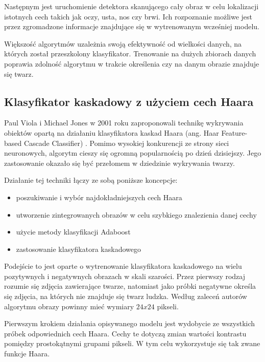 Następnym jest uruchomienie detektora skanującego cały obraz w celu lokalizacji istotnych cech takich jak oczy, usta, nos czy brwi. Ich rozpoznanie możliwe jest przez zgromadzone informacje znajdujące się w wytrenowanym wcześniej modelu.

Większość algorytmów uzależnia swoją efektywność od wielkości danych, na których został przeszkolony klasyfikator. Trenowanie na dużych zbiorach danych poprawia zdolność algorytmu w trakcie określenia czy na danym obrazie znajduje się twarz. \cite{fDetection}


\subsection{Klasyfikator kaskadowy z użyciem cech Haara}
\label{sub:Haar}
Paul Viola i Michael Jones w 2001 roku zaproponowali technikę wykrywania obiektów opartą na działaniu klasyfikatora kaskad Haara (ang. Haar Feature-based Cascade Classifier) \cite{haar}. Pomimo wysokiej konkurencji ze strony sieci neuronowych, algorytm cieszy się ogromną popularnością po dzień dzisiejszy. Jego zastosowanie okazało się być przełomem w dziedzinie wykrywania twarzy. 

Działanie tej techniki łączy ze sobą poniższe koncepcje:
\begin{itemize}
    \item poszukiwanie i wybór najdokładniejszych cech Haara
    \item utworzenie zintegrowanych obrazów w celu szybkiego znalezienia danej cechy
    \item użycie metody klasyfikacji Adaboost
    \item zastosowanie klasyfikatora kaskadowego
\end{itemize}

Podejście to jest oparte o wytrenowanie klasyfikatora kaskadowego na wielu pozytywnych i negatywnych obrazach w skali szarości. Przez pierwszy rodzaj rozumie się zdjęcia zawierające twarze, natomiast jako próbki negatywne określa się zdjęcia, na których nie znajduje się twarz ludzka. Według zaleceń autorów algorytmu obrazy powinny mieć wymiary $24x24$ pikseli.

Pierwszym krokiem działania opisywanego modelu jest wydobycie ze wszystkich próbek odpowiednich cech Haara. Cechy te dotyczą zmian wartości kontrastu pomiędzy prostokątnymi grupami pikseli. W tym celu wykorzystuje się tak zwane funkcje Haara.

